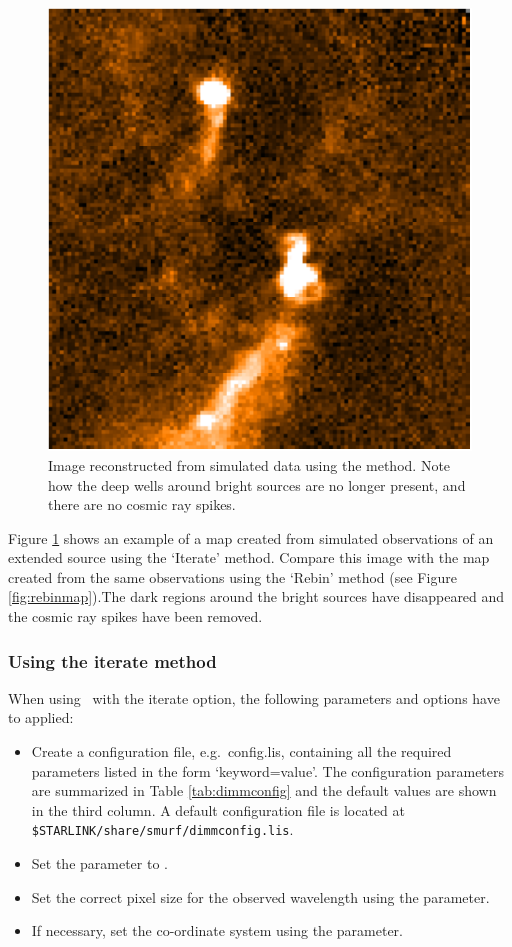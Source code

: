 \documentclass[oneside,11pt]{starlink}
\begin{document}
\begin{figure}[htb]
  \begin{center}
    \includegraphics[width=0.7\linewidth]{sun258_itermap}
    \caption{Image reconstructed from simulated data using the
       method. Note how the deep wells around bright
      sources are no longer present, and there are no cosmic ray
      spikes.}
    \label{fig:itermap}
  \end{center}
\end{figure}

Figure \ref{fig:itermap} shows an example of a map created from
simulated observations of an extended source using the `Iterate'
method. Compare this image with the map created from the same
observations using the `Rebin' method (see Figure
\ref{fig:rebinmap}).The dark regions around the bright sources have
disappeared and the cosmic ray spikes have been removed.


\subsubsection{Using the iterate method}

When using \makemap\ with the iterate option, the following parameters
and options have to applied:

\begin{itemize}
\item Create a configuration file, e.g.\ config.lis, containing all the
  required parameters listed in the form `keyword=value'. The
  configuration parameters are summarized in Table \ref{tab:dimmconfig}
  and the default values are shown in the third column. A default
  configuration file is located at
  \texttt{\$STARLINK/share/smurf/dimmconfig.lis}.
\item Set the  parameter to .
\item Set the correct pixel size for the observed wavelength using the
   parameter.
\item If necessary, set the co-ordinate system using the 
  parameter.
\end{itemize}
\end{document}
